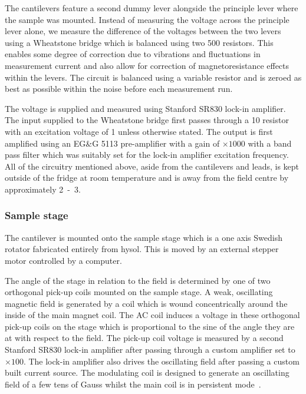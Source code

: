 The cantilevers feature a second dummy lever alongside the principle lever where the sample was mounted. Instead of measuring the voltage across the principle lever alone, we measure the difference of the voltages between the two levers using a Wheatstone bridge which is balanced using two \unit{500}{\ohm} resistors. This enables some degree of correction due to vibrations and fluctuations in measurement current and also allow for correction of magnetoresistance effects within the levers. The circuit is balanced using a variable resistor and is zeroed as best as possible within the noise before each measurement run.

The voltage is supplied and measured using Stanford SR830 lock-in amplifier. The input supplied to the Wheatstone bridge first passes through a \unit{10}{\kilo\ohm} resistor with an excitation voltage of \unit{1}{\volt} unless otherwise stated. The output is first amplified using an EG\&G 5113 pre-amplifier with a gain of $\times1000$ with a band pass filter which was suitably set for the lock-in amplifier excitation frequency. All of the circuitry mentioned above, aside from the cantilevers and leads, is kept outside of the fridge at room temperature and is away from the field centre by approximately \unit{2-3}{\metre}.

\subsubsection{Sample stage}

The cantilever is mounted onto the sample stage which is a one axis Swedish rotator fabricated entirely from hysol. This is moved by an external stepper motor controlled by a computer. 

The angle of the stage in relation to the field is determined by one of two orthogonal pick-up coils mounted on the sample stage. A weak, oscillating magnetic field is generated by a coil which is wound concentrically around the inside of the main magnet coil. The AC coil induces a voltage in these orthogonal pick-up coils on the stage which is proportional to the sine of the angle they are at with respect to the field. The pick-up coil voltage is measured by a second Stanford SR830 lock-in amplifier after passing through a custom amplifier set to $\times100$. The lock-in amplifier also drives the oscillating field after passing a custom built current source. The modulating coil is designed to generate an oscillating field of a few tens of Gauss whilst the main coil is in persistent mode~\cite{Instruments1998}.

